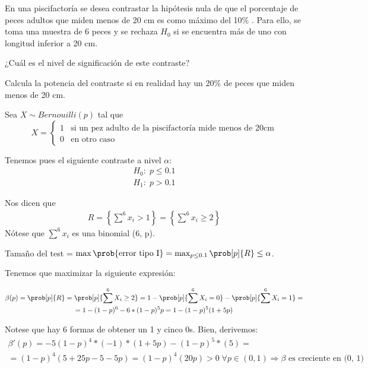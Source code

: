\pagebreak
\begin{problem}[2]

En una piscifactoría se desea contrastar la hipótesis nula de que el porcentaje de peces adultos que miden menos de 20 cm es como máximo del 10\% . Para ello, se toma una muestra de 6 peces y se rechaza $H_0$ si se encuentra más de uno con longitud inferior a 20 cm.

\ppart ¿Cuál es el nivel de significación de este contraste?

\ppart Calcula la potencia del contraste si en realidad hay un 20\% de peces que miden menos de 20 cm.

\solution

Sea $X \sim Bernouilli(p)$ tal que
\[
X = \begin{cases}
1 & \text{si un pez adulto de la piscifactoría mide menos de 20cm} \\
0 & \text{en otro caso}
\end{cases}
\]

Tenemos pues el siguiente contraste a nivel $\alpha$:
\begin{gather*}
H_0: \; p \leq 0.1\\
H_1: \; p > 0.1
\end{gather*}

Nos dicen que
\begin{gather*}
R = \left\{ \sum\limits^6 x_i > 1 \right\} =
\left\{ \sum\limits^6 x_i \geq 2 \right\}
\end{gather*}
Nótese que $\sum\limits^6 x_i$ es una binomial (6, p).

\spart
Tamaño del test = $\max \prob{ \text{error tipo I} } = \max_{p \leq 0.1} \prob[p]{R} \leq \alpha$.

Tenemos que maximizar la siguiente expresión:

\begin{gather*}
\beta(p) =
\prob[p]{R} =
\prob[p]{\sum\limits^6 X_i \geq 2} =
1 - \prob[p]{\sum\limits^6 X_i = 0} - \prob[p]{\sum\limits^6 X_i = 1} =\\
= 1 - (1 - p)^6 - 6*(1 - p)^5 p =
1 - (1 - p)^5 (1 + 5p)
\end{gather*}

Notese que hay 6 formas de obtener un 1 y cinco 0s. Bien, derivemos:
\begin{gather*}
\beta'(p) = -5 (1 - p)^4 * (-1) * (1 + 5p) - (1 - p)^5 * (5) =\\
= (1 - p)^4 (5 + 25p - 5 - 5p) =
(1 - p)^4 (20p) > 0 \; \forall p \in (0, 1)
\Rightarrow \beta \text{ es creciente en (0, 1)}
\end{gather*}


\end{problem}
